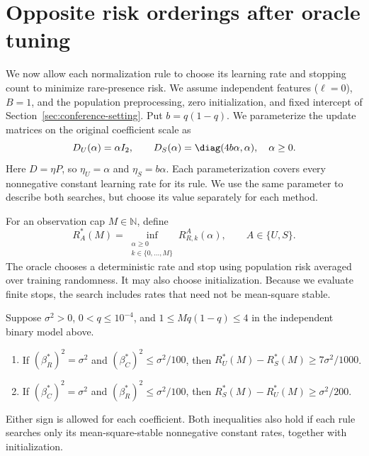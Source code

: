 \section{Opposite risk orderings after oracle tuning}
\label{sec:conference-predictive}

We now allow each normalization rule to choose its learning rate and stopping
count to minimize rare-presence risk. We assume independent features
($\ell = 0$), $B = 1$, and the population preprocessing, zero initialization,
and fixed intercept of Section~\ref{sec:conference-setting}. Put $b = q(1-q)$.
We parameterize the update matrices on the original coefficient scale as
\begin{equation}
 D_U(\alpha) = \alpha I_2,\qquad
 D_S(\alpha) = \diag(4b\alpha,\alpha),\quad \alpha\geq0.
 \label{eq:conference-oracle-rates}
\end{equation}
Here $D=\eta P$, so $\eta_U=\alpha$ and $\eta_S=b\alpha$. Each
parameterization covers every nonnegative constant learning rate for its rule.
We use the same parameter to describe both searches, but choose its value
separately for each method.

For an observation cap $M\in\mathbb N$, define
\begin{equation}
 R_A^*(M)=\inf_{\substack{\alpha\geq0\\ k\in\{0,\ldots,M\}}}
             R_{R,k}^{A}(\alpha),\qquad A\in\{U,S\}.
 \label{eq:conference-oracle-risk}
\end{equation}
The oracle chooses a deterministic rate and stop using population risk averaged
over training randomness. It may also choose initialization. Because we evaluate
finite stops, the search includes rates that need not be mean-square stable.

\begin{theorem}
 \label{thm:conference-predictive}
 Suppose $\sigma^2>0$, $0<q\leq10^{-4}$, and
 $1\leq Mq(1-q)\leq4$ in the independent binary model above.
 \begin{enumerate}
  \item If $(\beta_R^*)^2=\sigma^2$ and
        $(\beta_C^*)^2\leq\sigma^2/100$, then
        $R_U^*(M)-R_S^*(M)\geq7\sigma^2/1000$.
  \item If $(\beta_C^*)^2=\sigma^2$ and
        $(\beta_R^*)^2\leq\sigma^2/100$, then
        $R_S^*(M)-R_U^*(M)\geq\sigma^2/200$.
 \end{enumerate}
 Either sign is allowed for each coefficient. Both inequalities also hold if
 each rule searches only its mean-square-stable nonnegative constant rates,
 together with initialization.
\end{theorem}

